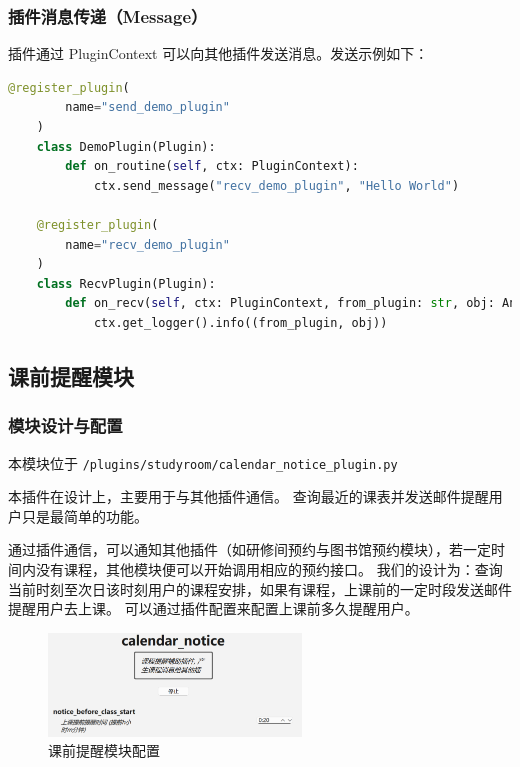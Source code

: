 \documentclass[14pt,a4paper,UTF8,twoside]{article}
\begin{document}
\subsubsection{插件消息传递（Message）}

插件通过 PluginContext 可以向其他插件发送消息。发送示例如下：

\begin{lstlisting}[language=python, title = 发送消息示例]
    @register_plugin(
        name="send_demo_plugin"
    )
    class DemoPlugin(Plugin):
        def on_routine(self, ctx: PluginContext):
            ctx.send_message("recv_demo_plugin", "Hello World")
    
    @register_plugin(
        name="recv_demo_plugin"
    )
    class RecvPlugin(Plugin):
        def on_recv(self, ctx: PluginContext, from_plugin: str, obj: Any):
            ctx.get_logger().info((from_plugin, obj))
\end{lstlisting}

\subsection{课前提醒模块}

\subsubsection{模块设计与配置}

\begin{mdframed}
    本模块位于 \texttt{/plugins/studyroom/calendar\_notice\_plugin.py}
\end{mdframed}

本插件在设计上，主要用于与其他插件通信。
查询最近的课表并发送邮件提醒用户只是最简单的功能。

\begin{note}
通过插件通信，可以通知其他插件（如研修间预约与图书馆预约模块），若一定时间内没有课程，其他模块便可以开始调用相应的预约接口。
我们的设计为：查询当前时刻至次日该时刻用户的课程安排，如果有课程，上课前的一定时段发送邮件提醒用户去上课。
可以通过插件配置来配置上课前多久提醒用户。
\end{note}

\begin{figure}[H]
    \centering
    \includegraphics[width=0.6\textwidth]{img/calendar_notice_config.png}
    \caption{课前提醒模块配置}
    \label{fig:calendar_notice_config}
\end{figure}
\end{document}
